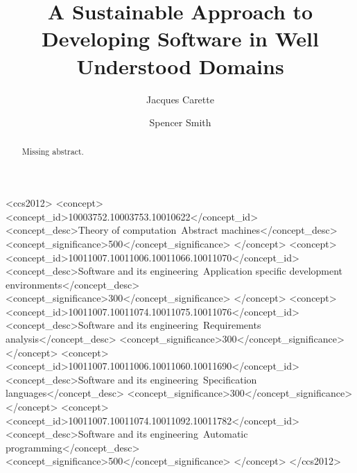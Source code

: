 \documentclass[sigconf,review]{acmart}
\begin{document}
\title{A Sustainable Approach to Developing Software in Well Understood Domains}

\author{Jacques Carette}

\author{Spencer Smith}

\begin{abstract}
  Missing abstract. %
\end{abstract}


\begin{CCSXML}
<ccs2012>
   <concept>
       <concept_id>10003752.10003753.10010622</concept_id>
       <concept_desc>Theory of computation~Abstract machines</concept_desc>
       <concept_significance>500</concept_significance>
       </concept>
   <concept>
       <concept_id>10011007.10011006.10011066.10011070</concept_id>
       <concept_desc>Software and its engineering~Application specific development environments</concept_desc>
       <concept_significance>300</concept_significance>
       </concept>
   <concept>
       <concept_id>10011007.10011074.10011075.10011076</concept_id>
       <concept_desc>Software and its engineering~Requirements analysis</concept_desc>
       <concept_significance>300</concept_significance>
       </concept>
   <concept>
       <concept_id>10011007.10011006.10011060.10011690</concept_id>
       <concept_desc>Software and its engineering~Specification languages</concept_desc>
       <concept_significance>300</concept_significance>
       </concept>
   <concept>
       <concept_id>10011007.10011074.10011092.10011782</concept_id>
       <concept_desc>Software and its engineering~Automatic programming</concept_desc>
       <concept_significance>500</concept_significance>
       </concept>
 </ccs2012>
\end{CCSXML}

\end{document}
